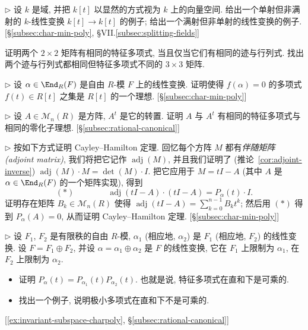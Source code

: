 \begin{prob}\label{ex:k[t]-injective-not-surjective}
$\triangleright$ 设 $k$ 是域, 并把 $k[t]$ 以显然的方式视为 $k$ 上的向量空间. 给出一个单射但非满射的 $k$-线性变换 $k[t]\to k[t]$ 的例子; 给出一个满射但非单射的线性变换的例子. [§\ref{subsec:char-min-poly}, §VII.\ref{subsec:splitting-fields}]
\end{prob}

\begin{prob}\label{ex:2x2-charpoly-trace-det}
证明两个 $2\times2$ 矩阵有相同的特征多项式, 当且仅当它们有相同的迹与行列式. 找出两个迹与行列式都相同但特征多项式不同的 $3\times3$ 矩阵.
\end{prob}

\begin{prob}\label{ex:annihilator-ideal-of-endomorphism}
$\triangleright$ 设 $\alpha\in\End_R(F)$ 是自由 $R$-模 $F$ 上的线性变换. 证明使得 $f(\alpha)=0$ 的多项式 $f(t)\in R[t]$ 之集是 $R[t]$ 的一个理想. [§\ref{subsec:char-min-poly}]
\end{prob}

\begin{prob}\label{ex:transpose-same-charpoly}
$\triangleright$ 设 $A\in\mathcal{M}_n(R)$ 是方阵, $A^t$ 是它的转置. 证明 $A$ 与 $A^t$ 有相同的特征多项式与相同的零化子理想. [§\ref{subsec:rational-canonical}]
\end{prob}

\begin{prob}\label{ex:prove-cayley-hamilton}
$\triangleright$ 按如下方式证明 Cayley--Hamilton 定理. 回忆每个方阵 $M$ 都有\emph{伴随矩阵 (adjoint matrix)}, 我们将把它记作 $\operatorname{adj}(M)$, 并且我们证明了 (推论~\ref{cor:adjoint-inverse}) $\operatorname{adj}(M)\cdot M=\det(M)\cdot I$. 把它应用于 $M=tI-A$ (其中 $A$ 是 $\alpha\in\End_R(F)$ 的一个矩阵实现), 得到
\begin{equation*}
(\ast)\qquad\qquad \operatorname{adj}(tI-A)\cdot(tI-A)=P_\alpha(t)\cdot I.
\end{equation*}
证明存在矩阵 $B_k\in\mathcal{M}_n(R)$ 使得 $\operatorname{adj}(tI-A)=\sum_{k=0}^{n-1}B_kt^k$; 然后用 $(\ast)$ 得到 $P_\alpha(A)=0$, 从而证明 Cayley--Hamilton 定理. [§\ref{subsec:char-min-poly}]
\end{prob}

\begin{prob}\label{ex:charpoly-multiplicative-dsum}
$\triangleright$ 设 $F_1$, $F_2$ 是有限秩的自由 $R$-模, $\alpha_1$ (相应地, $\alpha_2$) 是 $F_1$ (相应地, $F_2$) 的线性变换. 设 $F=F_1\oplus F_2$, 并设 $\alpha=\alpha_1\oplus\alpha_2$ 是 $F$ 的线性变换, 它在 $F_1$ 上限制为 $\alpha_1$, 在 $F_2$ 上限制为 $\alpha_2$.
\begin{itemize}
	\item 证明 $P_\alpha(t)=P_{\alpha_1}(t)P_{\alpha_2}(t)$. 也就是说, 特征多项式在直和下是可乘的.
	\item 找出一个例子, 说明极小多项式在直和下不是可乘的.
\end{itemize}
[\ref{ex:invariant-subspace-charpoly}, §\ref{subsec:rational-canonical}]
\end{prob}

